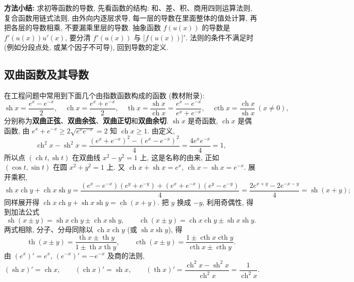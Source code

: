 \documentclass[UTF8,openany]{ctexbook}
\theoremstyle{chinesetextbook}
\begin{document}
\par\indent\textbf{方法小结:} 求初等函数的导数, 先看函数的结构: 和、差、积、商用四则运算法则, 复合函数用链式法则, 由外向内逐层求导, 每一层的导数在里面整体的值处计算, 再把各层的导数相乘, 不要漏乘里层的导数. 抽象函数 $f(u(x))$ 的导数是 $f'(u(x))u'(x)$, 要分清 $f'(u(x))$ 与 $\bigl[f(u(x))\bigr]'$. 法则的条件不满足时 (例如分段点处, 或某个因子不可导), 回到导数的定义.
\subsection{双曲函数及其导数}
在工程问题中常用到下面几个由指数函数构成的函数 (教材附录):
\[
\operatorname{sh}x=\frac{e^x-e^{-x}}2,\quad\operatorname{ch}x=\frac{e^x+e^{-x}}2,\quad\operatorname{th}x=\frac{\operatorname{sh}x}{\operatorname{ch}x}=\frac{e^x-e^{-x}}{e^x+e^{-x}},\quad\operatorname{cth}x=\frac{\operatorname{ch}x}{\operatorname{sh}x}\ (x\ne0),
\]
分别称为\textbf{双曲正弦}、\textbf{双曲余弦}、\textbf{双曲正切}和\textbf{双曲余切}. $\operatorname{sh}x$ 是奇函数, $\operatorname{ch}x$ 是偶函数, 由 $e^x+e^{-x}\ge2\sqrt{e^xe^{-x}}=2$ 知 $\operatorname{ch}x\ge1$. 由定义,
\[
\operatorname{ch}^2x-\operatorname{sh}^2x=\frac{(e^x+e^{-x})^2-(e^x-e^{-x})^2}4=\frac{4e^xe^{-x}}4=1,
\]
所以点 $(\operatorname{ch}t,\operatorname{sh}t)$ 在双曲线 $x^2-y^2=1$ 上, 这是名称的由来, 正如 $(\cos t,\sin t)$ 在圆 $x^2+y^2=1$ 上. 又 $\operatorname{ch}x+\operatorname{sh}x=e^x$, $\operatorname{ch}x-\operatorname{sh}x=e^{-x}$. 展开乘积,
\[
\operatorname{sh}x\operatorname{ch}y+\operatorname{ch}x\operatorname{sh}y=\frac{(e^x-e^{-x})(e^y+e^{-y})+(e^x+e^{-x})(e^y-e^{-y})}4=\frac{2e^{x+y}-2e^{-x-y}}4=\operatorname{sh}(x+y);
\]
同样展开得 $\operatorname{ch}x\operatorname{ch}y+\operatorname{sh}x\operatorname{sh}y=\operatorname{ch}(x+y)$. 把 $y$ 换成 $-y$, 利用奇偶性, 得到加法公式
\[
\operatorname{sh}(x\pm y)=\operatorname{sh}x\operatorname{ch}y\pm\operatorname{ch}x\operatorname{sh}y,\qquad\operatorname{ch}(x\pm y)=\operatorname{ch}x\operatorname{ch}y\pm\operatorname{sh}x\operatorname{sh}y.
\]
两式相除, 分子、分母同除以 $\operatorname{ch}x\operatorname{ch}y$ (或 $\operatorname{sh}x\operatorname{sh}y$), 得
\[
\operatorname{th}(x\pm y)=\frac{\operatorname{th}x\pm\operatorname{th}y}{1\pm\operatorname{th}x\operatorname{th}y},\qquad\operatorname{cth}(x\pm y)=\frac{1\pm\operatorname{cth}x\operatorname{cth}y}{\operatorname{cth}x\pm\operatorname{cth}y}.
\]
由 $(e^x)'=e^x$, $(e^{-x})'=-e^{-x}$ 及商的法则,
\[
(\operatorname{sh}x)'=\operatorname{ch}x,\qquad(\operatorname{ch}x)'=\operatorname{sh}x,\qquad(\operatorname{th}x)'=\frac{\operatorname{ch}^2x-\operatorname{sh}^2x}{\operatorname{ch}^2x}=\frac1{\operatorname{ch}^2x}.
\]
\end{document}
